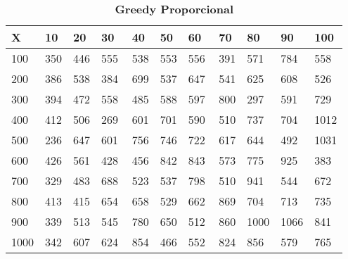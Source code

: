 \documentclass[10pt,letterpaper]{article}
\begin{document}
\begin{center}
\begin{table}\renewcommand{\arraystretch}{2.5}
\caption{\large \textbf{Greedy Proporcional}}
\centering
\begin{tabular} { |m{0.5cm}|m{1.3cm}|m{1.3cm}|m{1.3cm}|m{1.3cm}|m{1.3cm}|m{1.3cm}|m{1.3cm}|m{1.3cm}|m{1.3cm}|m{1.3cm}|} 
\hline
\rowcolor{Gray}
\centering \textbf{X} & \centering \textbf{10} & \centering \textbf{20} & \centering \textbf{30}\ & \centering \textbf{40} & \centering \textbf{50} & \centering \textbf{60}\ & \centering \textbf{70} & \centering \textbf{80} & \centering \textbf{90}\ & \textbf{100} \\\hline
\cellcolor{Gray}100 & \Large 350 & \Large 446 & \Large 555 & \Large 538 & \Large 553 & \Large 556 & \Large 391 & \Large 571 & \Large 784 & \Large 558 \\
\hline
\cellcolor{Gray}200 & \Large 386 & \Large 538 & \Large 384 & \Large 699 & \Large 537 & \Large 647 & \Large 541 & \Large 625 & \Large 608 & \Large 526 \\
\hline
\cellcolor{Gray}300 & \Large 394 & \Large 472 & \Large 558 & \Large 485 & \Large 588 & \Large 597 & \Large 800 & \Large 297 & \Large 591 & \Large 729 \\
\hline
\cellcolor{Gray}400 & \Large 412 & \Large 506 & \Large 269 & \Large 601 & \Large 701 & \Large 590 & \Large 510 & \Large 737 & \Large 704 & \Large 1012 \\
\hline
\cellcolor{Gray}500 & \Large 236 & \Large 647 & \Large 601 & \Large 756 & \Large 746 & \Large 722 & \Large 617 & \Large 644 & \Large 492 & \Large 1031 \\
\hline
\cellcolor{Gray}600 & \Large 426 & \Large 561 & \Large 428 & \Large 456 & \Large 842 & \Large 843 & \Large 573 & \Large 775 & \Large 925 & \Large 383 \\
\hline
\cellcolor{Gray}700 & \Large 329 & \Large 483 & \Large 688 & \Large 523 & \Large 537 & \Large 798 & \Large 510 & \Large 941 & \Large 544 & \Large 672 \\
\hline
\cellcolor{Gray}800 & \Large 413 & \Large 415 & \Large 654 & \Large 658 & \Large 529 & \Large 662 & \Large 869 & \Large 704 & \Large 713 & \Large 735 \\
\hline
\cellcolor{Gray}900 & \Large 339 & \Large 513 & \Large 545 & \Large 780 & \Large 650 & \Large 512 & \Large 860 & \Large 1000 & \Large 1066 & \Large 841 \\
\hline
\cellcolor{Gray}1000 & \Large 342 & \Large 607 & \Large 624 & \Large 854 & \Large 466 & \Large 552 & \Large 824 & \Large 856 & \Large 579 & \Large 765 \\
\hline
\end{tabular} \\
\end{table}
\end{center}
\end{document}
